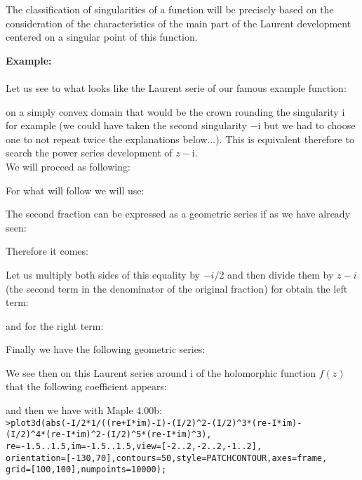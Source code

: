 	The classification of singularities of a function will be precisely based on the consideration of the characteristics of the main part of the Laurent  development centered on a singular point of this function.
	\begin{tcolorbox}[colframe=black,colback=white,sharp corners]
	\textbf{{\Large {}}Example:}\\\\
	Let us see to what looks like the Laurent serie of our famous example function:
	
	on a simply convex domain that would be the crown rounding the singularity  $\mathrm{i}$ for example (we could have taken the second singularity $-\mathrm{i}$ but we had to choose one to not repeat twice the explanations below...). This is equivalent therefore to search the power series development of $z-\mathrm{i}$. \\
	
	We will proceed as following:
	
	For what will follow we will use:
	
	\end{tcolorbox}
	
	\pagebreak
	\begin{tcolorbox}[colframe=black,colback=white,sharp corners]
	The second fraction can be expressed as a geometric series if as we have already seen:
	
	Therefore it comes:
	
	Let us multiply both sides of this equality by $-i / $2 and then divide them by $z - i$ (the second term in the denominator of the original fraction) for obtain the left term:
	
	and for the right term:
	
	Finally we have the following geometric series:
	
	We see then on this Laurent series around $\mathrm{i}$ of the holomorphic function $f(z)$ that the following coefficient appears:
	
	and then we have with Maple 4.00b:\\
	
	\texttt{>plot3d(abs(-I/2*1/((re+I*im)-I)-(I/2)\string^2-(I/2)\string^3*(re-I*im)-\\
	(I/2)\string^4*(re-I*im)\string^2-(I/2)\string^5*(re-I*im)\string^3),\\
	re=-1.5..1.5,im=-1.5..1.5,view=[-2..2,-2..2,-1..2],\\
	orientation=[-130,70],contours=50,style=PATCHCONTOUR,axes=frame,\\
	grid=[100,100],numpoints=10000);}
	\end{tcolorbox}
	
